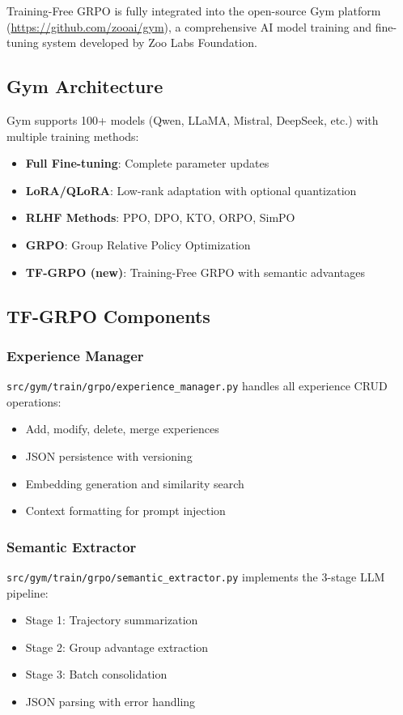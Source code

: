 \documentclass[11pt,a4paper]{article}
\begin{document}
Training-Free GRPO is fully integrated into the open-source Gym platform (\url{https://github.com/zooai/gym}), a comprehensive AI model training and fine-tuning system developed by Zoo Labs Foundation.

\subsection{Gym Architecture}

Gym supports 100+ models (Qwen, LLaMA, Mistral, DeepSeek, etc.) with multiple training methods:
\begin{itemize}
    \item \textbf{Full Fine-tuning}: Complete parameter updates
    \item \textbf{LoRA/QLoRA}: Low-rank adaptation with optional quantization
    \item \textbf{RLHF Methods}: PPO, DPO, KTO, ORPO, SimPO
    \item \textbf{GRPO}: Group Relative Policy Optimization
    \item \textbf{TF-GRPO (new)}: Training-Free GRPO with semantic advantages
\end{itemize}

\subsection{TF-GRPO Components}

\subsubsection{Experience Manager}
\texttt{src/gym/train/grpo/experience\_manager.py} handles all experience CRUD operations:
\begin{itemize}
    \item Add, modify, delete, merge experiences
    \item JSON persistence with versioning
    \item Embedding generation and similarity search
    \item Context formatting for prompt injection
\end{itemize}

\subsubsection{Semantic Extractor}
\texttt{src/gym/train/grpo/semantic\_extractor.py} implements the 3-stage LLM pipeline:
\begin{itemize}
    \item Stage 1: Trajectory summarization
    \item Stage 2: Group advantage extraction
    \item Stage 3: Batch consolidation
    \item JSON parsing with error handling
\end{itemize}
\end{document}
